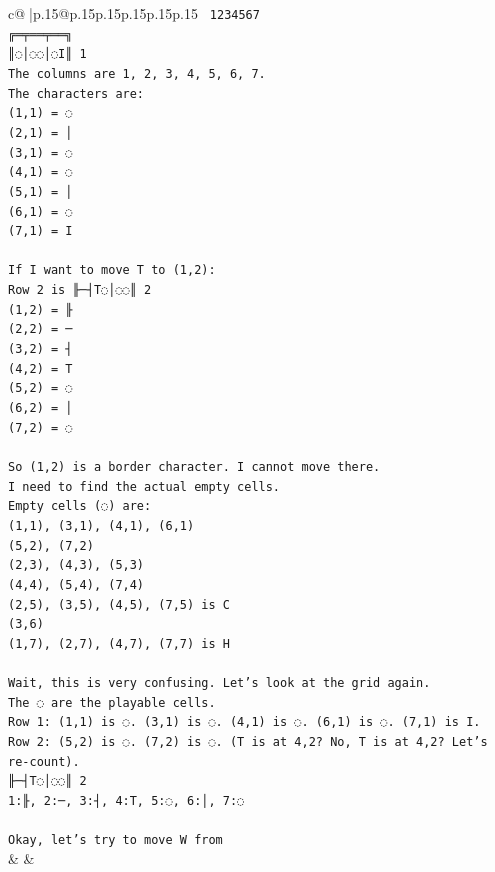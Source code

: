 \documentclass{article}
\begin{document}
{\begin{supertabular}{c@{$\;$}|p{.15\linewidth}@{}p{.15\linewidth}p{.15\linewidth}p{.15\linewidth}p{.15\linewidth}p{.15\linewidth}}
{{{\texttt{ 1234567} \\
\texttt{╔═╤══╤══╗} \\
\texttt{║◌│◌◌│◌I║ 1} \\
\texttt{The columns are 1, 2, 3, 4, 5, 6, 7.} \\
\texttt{The characters are:} \\
\texttt{(1,1) = ◌} \\
\texttt{(2,1) = │} \\
\texttt{(3,1) = ◌} \\
\texttt{(4,1) = ◌} \\
\texttt{(5,1) = │} \\
\texttt{(6,1) = ◌} \\
\texttt{(7,1) = I} \\
\\ 
\texttt{If I want to move T to (1,2):} \\
\texttt{Row 2 is ╟─┤T◌│◌◌║ 2} \\
\texttt{(1,2) = ╟} \\
\texttt{(2,2) = ─} \\
\texttt{(3,2) = ┤} \\
\texttt{(4,2) = T} \\
\texttt{(5,2) = ◌} \\
\texttt{(6,2) = │} \\
\texttt{(7,2) = ◌} \\
\\ 
\texttt{So (1,2) is a border character. I cannot move there.} \\
\texttt{I need to find the actual empty cells.} \\
\texttt{Empty cells (◌) are:} \\
\texttt{(1,1), (3,1), (4,1), (6,1)} \\
\texttt{(5,2), (7,2)} \\
\texttt{(2,3), (4,3), (5,3)} \\
\texttt{(4,4), (5,4), (7,4)} \\
\texttt{(2,5), (3,5), (4,5), (7,5) is C} \\
\texttt{(3,6)} \\
\texttt{(1,7), (2,7), (4,7), (7,7) is H} \\
\\ 
\texttt{Wait, this is very confusing. Let's look at the grid again.} \\
\texttt{The ◌ are the playable cells.} \\
\texttt{Row 1: (1,1) is ◌. (3,1) is ◌. (4,1) is ◌. (6,1) is ◌. (7,1) is I.} \\
\texttt{Row 2: (5,2) is ◌. (7,2) is ◌. (T is at 4,2? No, T is at 4,2? Let's re{-}count).} \\
\texttt{╟─┤T◌│◌◌║ 2} \\
\texttt{1:╟, 2:─, 3:┤, 4:T, 5:◌, 6:│, 7:◌} \\
\\ 
\texttt{Okay, let's try to move W from} \\
            }
        }
    }
    & & \\ \\


\end{supertabular}}
\end{document}
